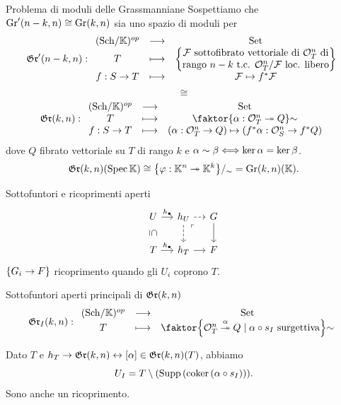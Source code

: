 \documentclass[a4paper]{beamer}
\begin{document}
\begin{frame}{Problema di moduli delle Grassmanniane}
Sospettiamo che $\mathrm{Gr}'(n-k,n)\cong \mathrm{Gr}(k,n)$ sia uno spazio di moduli per
\[\mathfrak{Gr}'(n-k,n):\begin{array}{ccc} {({\mathrm{Sch}}/{\mathbb{K}})^{op}} & \longrightarrow & {\mathrm{Set}}\\ {T} & \longmapsto & {\left\{{\begin{matrix}\mathcal{F}\text{ sottofibrato vettoriale di $\mathcal{O}_T^n$ di}\\ \text{rango $n-k$ t.c. $\mathcal{O}^n_T/\mathcal{F}$ loc. libero}\end{matrix}}\right\}}\\ {f:S\to T} & \longmapsto & {\mathcal{F}\mapsto f^\ast\mathcal{F}} \end{array}\]
\pause
\[\cong\]
\[\gr(k,n):\functorDef{(\Sch\K)\op}{\Set}{T}{\quot{\cpa{\al:\Oc_T^n\onto Q}}\sim}{f:S\to T}{(\al:\Oc_T^n\to Q)\mapsto (f^\ast\al:\Oc_S^n\to f^\ast Q)}\]
dove $Q$ fibrato vettoriale su $T$ di rango $k$ e $\alpha\sim \beta\Longleftrightarrow \ker\alpha=\ker\beta$.
\pause
\[\mathfrak{Gr}(k,n)(\mathrm{Spec}\,\mathbb{K})\cong{\left\{{\varphi:\mathbb{K}^n\twoheadrightarrow\mathbb{K}^k}\right\}}/_\sim=\mathrm{Gr}(k,n)(\mathbb{K}).\]
\end{frame}

\begin{frame}{Sottofuntori e ricoprimenti aperti}
\[\begin{tikzcd}[ampersand replacement=\&, column sep=small]
	U \& {h_{U}} \& G \\
	T \& {h_T} \& F
	\arrow["\yo", from=1-1, to=1-2]
	\arrow["\subseteq"{marking, allow upside down}, draw=none, from=1-1, to=2-1]
	\arrow[dashed, from=1-2, to=1-3]
	\arrow[dashed, from=1-2, to=2-2]
	\arrow["\ulcorner"{anchor=center, pos=0.125}, draw=none, from=1-2, to=2-3]
	\arrow[from=1-3, to=2-3]
	\arrow["\yo", from=2-1, to=2-2]
	\arrow[from=2-2, to=2-3]
\end{tikzcd}\]
$\left\{{G_i\to F}\right\}$ ricoprimento quando gli $U_i$ coprono $T$.
\pause
\begin{block}{Sottofuntori aperti principali di $\mathfrak{Gr}(k,n)$}
\[\gr_I(k,n):\funcDef{(\Sch\K)\op}{\Set}{T}{\quot{\cpa{\Oc_T^n\overset{\al}\onto Q\mid \al\circ s_I\text{ surgettiva}}}\sim}\]
\end{block}
Dato $T$ e $h_T\to \mathfrak{Gr}(k,n)\leftrightarrow [\alpha]\in \mathfrak{Gr}(k,n)(T)$, abbiamo \[U_I=T\setminus (\mathrm{Supp}\, (\mathrm{coker}\,(\alpha\circ s_I))).\]
Sono anche un ricoprimento.
\end{frame}
\end{document}
